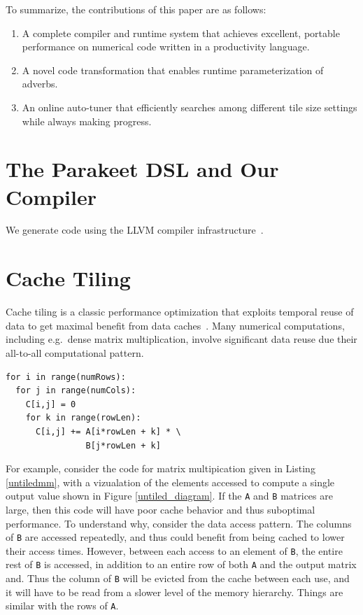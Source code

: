 \documentclass[preprint,9pt]{sigplanconf}
\begin{document}
To summarize, the contributions of this paper are as follows:

\begin{enumerate}
 \item A complete compiler and runtime system that achieves excellent, portable performance on numerical code written in a productivity language.
 \item A novel code transformation that enables runtime parameterization of adverbs.
 \item An online auto-tuner that efficiently searches among different tile size settings while always making progress.
\end{enumerate}

\section{The Parakeet DSL and Our Compiler}
\label{parakeet}
We generate code using the LLVM compiler infrastructure~\cite{Latt02}.

\section{Cache Tiling}
\label{cache_tiling}

Cache tiling is a classic performance optimization that exploits temporal reuse of data to get maximal benefit from data caches~\cite{Lam91, Wolf91}.  Many numerical computations, including e.g.~dense matrix multiplication, involve significant data reuse due their all-to-all computational pattern.

\begin{lstlisting}[frame=single, label=untiledmm, caption={Untiled Matrix Multiply}, belowskip=0.5em]
for i in range(numRows):
  for j in range(numCols):
    C[i,j] = 0
    for k in range(rowLen):
      C[i,j] += A[i*rowLen + k] * \
                B[j*rowLen + k]
\end{lstlisting}

For example, consider the code for matrix multipication given in Listing \ref{untiledmm}, with a vizualation of the elements accessed to compute a single output value shown in Figure \ref{untiled_diagram}.  If the \lstinline{A} and \lstinline{B} matrices are large, then this code will have poor cache behavior and thus suboptimal performance.  To understand why, consider the data access pattern.  The columns of \lstinline{B} are accessed repeatedly, and thus could benefit from being cached to lower their access times.  However, between each access to an element of \lstinline{B}, the entire rest of \lstinline{B} is accessed, in addition to an entire row of both \lstinline{A} and the output matrix and.  Thus the column of \lstinline{B} will be evicted from the cache between each use, and it will have to be read from a slower level of the memory hierarchy.  Things are similar with the rows of \lstinline{A}.
\end{document}

